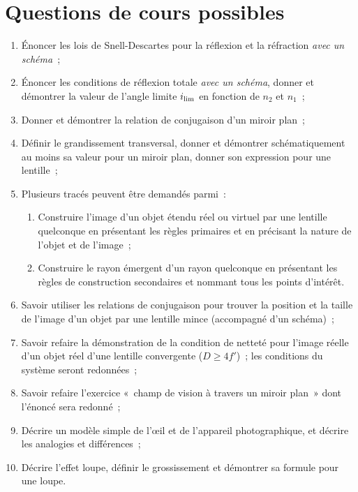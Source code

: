 \documentclass[a4paper, 12pt, final, garamond]{book}
\begin{document}
\section{Questions de cours possibles}
\begin{enumerate}
    \item Énoncer les lois de Snell-Descartes pour la réflexion et la réfraction
        \textit{avec un schéma}~;
    \item Énoncer les conditions de réflexion totale \textit{avec un schéma},
        donner et démontrer la valeur de l'angle limite $i_{\rm lim}$ en
        fonction de $n_2$ et $n_1$~;
    \item Donner et démontrer la relation de conjugaison d'un miroir plan~;
    \item Définir le grandissement transversal, donner et démontrer
        schématiquement au moins sa valeur pour un miroir plan, donner son
        expression pour une lentille~;
    \item Plusieurs tracés peuvent être demandés parmi~:
        \begin{enumerate}
            \item Construire l'image d'un objet étendu réel ou virtuel par une
                lentille quelconque en présentant les règles primaires et en
                précisant la nature de l'objet et de l'image~;
            \item Construire le rayon émergent d'un rayon quelconque en
                présentant les règles de construction secondaires et nommant
                tous les points d'intérêt.
        \end{enumerate}
    \item Savoir utiliser les relations de conjugaison pour trouver la position
        et la taille de l'image d'un objet par une lentille mince (accompagné
        d'un schéma)~;
    \item Savoir refaire la démonstration de la condition de netteté pour
        l'image réelle d'un objet réel d'une lentille convergente ($D \geq
        4f'$)~; les conditions du système seront redonnées~;
    \item Savoir refaire l'exercice «~champ de vision à travers un miroir
        plan~» dont l'énoncé sera redonné~;
    \item Décrire un modèle simple de l'œil et de l'appareil photographique, et
        décrire les analogies et différences~;
    \item Décrire l'effet loupe, définir le grossissement et démontrer sa
        formule pour une loupe.
\end{enumerate}
\end{document}
